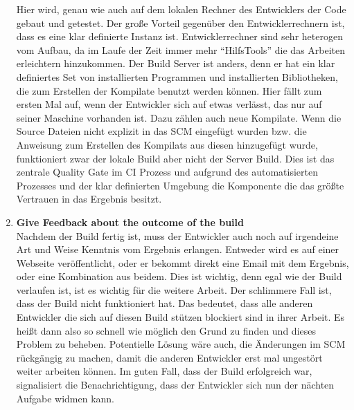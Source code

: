 \begin{enumerate}
		Hier wird, genau wie auch auf dem lokalen Rechner des Entwicklers der Code gebaut und getestet. Der große Vorteil gegenüber den Entwicklerrechnern ist, dass es eine klar definierte Instanz ist. Entwicklerrechner sind sehr heterogen vom Aufbau, da im Laufe der Zeit immer mehr "`HilfsTools"' die das Arbeiten erleichtern hinzukommen. Der Build Server ist anders, denn er hat ein klar definiertes Set von installierten Programmen und installierten Bibliotheken, die zum Erstellen der Kompilate benutzt werden können. Hier fällt zum ersten Mal auf, wenn der Entwickler sich auf etwas verlässt, das nur auf seiner Maschine vorhanden ist. Dazu zählen auch neue Kompilate. Wenn die Source Dateien nicht explizit in das SCM eingefügt wurden bzw. die Anweisung zum Erstellen des Kompilats aus diesen hinzugefügt wurde, funktioniert zwar der lokale Build aber nicht der Server Build. Dies ist das zentrale Quality Gate im CI Prozess und aufgrund des automatisierten Prozesses und der klar definierten Umgebung die Komponente die das größte Vertrauen in das Ergebnis besitzt.
		\item \textbf{Give Feedback about the outcome of the build}\\%
		Nachdem der Build fertig ist, muss der Entwickler auch noch auf irgendeine Art und Weise Kenntnis vom Ergebnis erlangen. Entweder wird es auf einer Webseite veröffentlicht, oder er bekommt direkt eine Email mit dem Ergebnis, oder eine Kombination aus beidem. Dies ist wichtig, denn egal wie der Build verlaufen ist, ist es wichtig für die weitere Arbeit. Der schlimmere Fall ist, dass der Build nicht funktioniert hat. Das bedeutet, dass alle anderen Entwickler die sich auf diesen Build stützen blockiert sind in ihrer Arbeit. Es heißt dann also so schnell wie möglich den Grund zu finden und dieses Problem zu beheben. Potentielle Lösung wäre auch, die Änderungen im SCM rückgängig zu machen, damit die anderen Entwickler erst mal ungestört weiter arbeiten können. Im guten Fall, dass der Build erfolgreich war, signalisiert die Benachrichtigung, dass der Entwickler sich nun der nächten Aufgabe widmen kann.
\end{enumerate}
